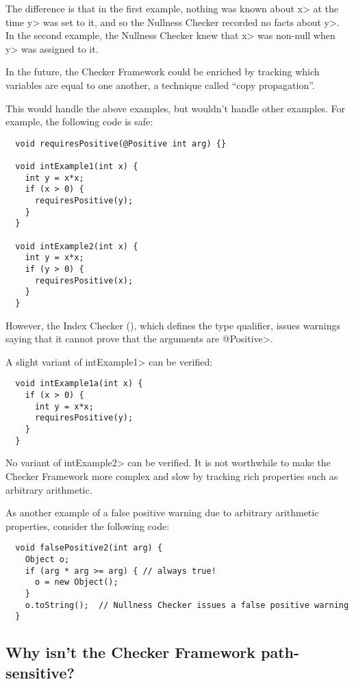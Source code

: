 The difference is that in the first example, nothing was known about \<x> at
the time \<y> was set to it, and so the Nullness Checker recorded no facts
about \<y>.  In the second example, the Nullness Checker knew that \<x>
was non-null when \<y> was assigned to it.

In the future, the Checker Framework could be enriched by tracking which
variables are equal to one another, a technique called ``copy
propagation''.

This would handle the above examples, but wouldn't handle other examples.
For example, the following code is safe:

\begin{Verbatim}
  void requiresPositive(@Positive int arg) {}

  void intExample1(int x) {
    int y = x*x;
    if (x > 0) {
      requiresPositive(y);
    }
  }

  void intExample2(int x) {
    int y = x*x;
    if (y > 0) {
      requiresPositive(x);
    }
  }
\end{Verbatim}

\noindent
However, the Index Checker (), which defines the
 type qualifier, issues warnings
saying that it cannot prove that the arguments are \<@Positive>.

A slight variant of \<intExample1> can be verified:

\begin{Verbatim}
  void intExample1a(int x) {
    if (x > 0) {
      int y = x*x;
      requiresPositive(y);
    }
  }
\end{Verbatim}

\noindent
No variant of \<intExample2> can be verified.  It is not worthwhile to make
the Checker Framework more complex and slow by tracking rich properties
such as arbitrary arithmetic.

As another example of a false positive warning due to arbitrary arithmetic
properties, consider the following code:

\begin{Verbatim}
  void falsePositive2(int arg) {
    Object o;
    if (arg * arg >= arg) { // always true!
      o = new Object();
    }
    o.toString();  // Nullness Checker issues a false positive warning
  }
\end{Verbatim}


\subsection{Why isn't the Checker Framework path-sensitive?\label{faq-path-sensitive}}

